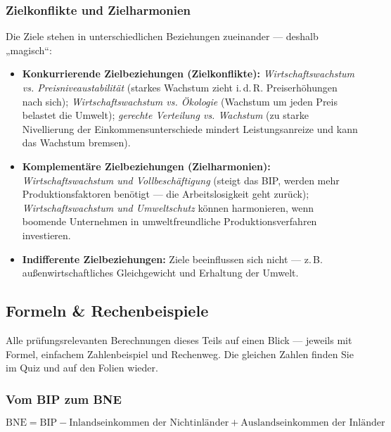\documentclass[11pt, a4paper]{article}
\begin{document}
\subsubsection{Zielkonflikte und Zielharmonien}

Die Ziele stehen in unterschiedlichen Beziehungen zueinander --- deshalb „magisch``:

\begin{itemize}
  \item \textbf{Konkurrierende Zielbeziehungen (Zielkonflikte):}
    \emph{Wirtschaftswachstum vs. Preisniveaustabilität} (starkes Wachstum zieht i.\,d.\,R.
    Preiserhöhungen nach sich); \emph{Wirtschaftswachstum vs. Ökologie} (Wachstum um jeden
    Preis belastet die Umwelt); \emph{gerechte Verteilung vs. Wachstum} (zu starke
    Nivellierung der Einkommensunterschiede mindert Leistungsanreize und kann das
    Wachstum bremsen).
  \item \textbf{Komplementäre Zielbeziehungen (Zielharmonien):}
    \emph{Wirtschaftswachstum und Vollbeschäftigung} (steigt das BIP, werden mehr
    Produktionsfaktoren benötigt --- die Arbeitslosigkeit geht zurück);
    \emph{Wirtschaftswachstum und Umweltschutz} können harmonieren, wenn boomende
    Unternehmen in umweltfreundliche Produktionsverfahren investieren.
  \item \textbf{Indifferente Zielbeziehungen:} Ziele beeinflussen sich nicht ---
    z.\,B. außenwirtschaftliches Gleichgewicht und Erhaltung der Umwelt.
\end{itemize}

\subsection{Formeln \& Rechenbeispiele}

Alle prüfungsrelevanten Berechnungen dieses Teils auf einen Blick --- jeweils mit
Formel, einfachem Zahlenbeispiel und Rechenweg. Die gleichen Zahlen finden Sie im Quiz
und auf den Folien wieder.

\subsubsection{Vom BIP zum BNE}

\begin{merksatz}[title={\bfseries Formel: BIP $\rightarrow$ BNE}]
\[
\text{BNE} = \text{BIP} - \text{Inlandseinkommen der Nichtinländer}
+ \text{Auslandseinkommen der Inländer}
\]
\end{merksatz}
\end{document}
